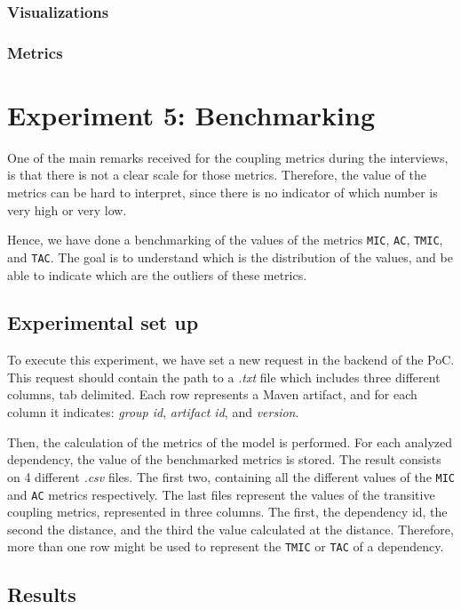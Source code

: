 \subsubsection{Visualizations}

\subsubsection{Metrics}

\section{Experiment 5: Benchmarking}
One of the main remarks received for the coupling metrics during the interviews, is that there is not a clear scale for those metrics. Therefore, the value of the metrics can be hard to interpret, since there is no indicator of which number is very high or very low.

Hence, we have done a benchmarking of the values of the metrics \texttt{MIC}, \texttt{AC}, \texttt{TMIC}, and \texttt{TAC}. The goal is to understand which is the distribution of the values, and be able to indicate which are the outliers of these metrics.

\subsection{Experimental set up}
To execute this experiment, we have set a new request in the backend of the PoC. This request should contain the path to a \textit{.txt} file which includes three different columns, tab delimited. Each row represents a Maven artifact, and for each column it indicates: \textit{group id}, \textit{artifact id}, and \textit{version}.

Then, the calculation of the metrics of the model is performed. For each analyzed dependency, the value of the benchmarked metrics is stored. The result consists on 4 different \textit{.csv} files. The first two, containing all the different values of the \texttt{MIC} and \texttt{AC} metrics respectively. The last files represent the values of the transitive coupling metrics, represented in three columns. The first, the dependency id, the second the distance, and the third the value calculated at the distance. Therefore, more than one row might be used to represent the \texttt{TMIC} or \texttt{TAC} of a dependency.

\subsection{Results}
